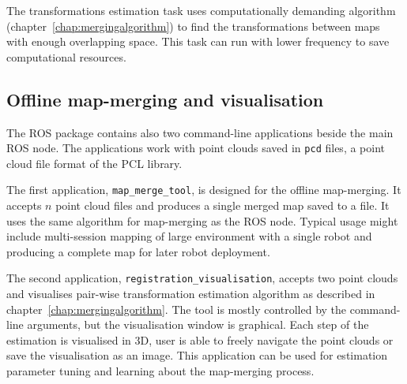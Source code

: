 The transformations estimation task uses computationally demanding algorithm (chapter~\ref{chap:mergingalgorithm}) to find the transformations between maps with enough overlapping space. This task can run with lower frequency to save computational resources.

\subsection{Offline map-merging and visualisation}
\label{sec:commandline-tools}

The \gls{ROS} package contains also two command-line applications beside the main \gls{ROS} node. The applications work with point clouds saved in \texttt{pcd} files, a point cloud file format of the \gls{PCL} library.

The first application, \texttt{map\_merge\_tool}, is designed for the offline map-merging. It accepts $n$ point cloud files and produces a single merged map saved to a file. It uses the same algorithm for map-merging as the \gls{ROS} node. Typical usage might include multi-session mapping of large environment with a single robot and producing a complete map for later robot deployment.

The second application, \texttt{registration\_visualisation}, accepts two point clouds and visualises pair-wise transformation estimation algorithm as described in chapter~\ref{chap:mergingalgorithm}. The tool is mostly controlled by the command-line arguments, but the visualisation window is graphical. Each step of the estimation is visualised in \gls{3D}, user is able to freely navigate the point clouds or save the visualisation as an image. This application can be used for estimation parameter tuning and learning about the map-merging process.

